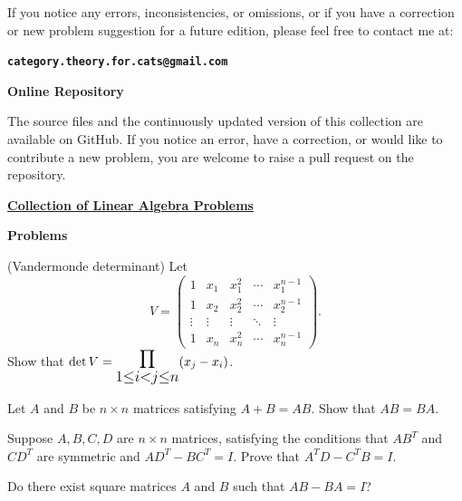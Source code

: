\documentclass[12pt]{article}
\let\oldprod\prod
\renewcommand{\prod}{\mathlarger{\mathlarger{\oldprod}}}
\begin{document}
If you notice any errors, inconsistencies, or omissions, or if you have a
correction or new problem suggestion for a future edition, please feel free to contact me at:

\noindent
\textbf{\texttt{category.theory.for.cats@gmail.com}}

\medskip

\noindent
\textbf{Online Repository}

\medskip

The source files and the continuously updated version of this collection are available on GitHub. If you notice an error, have a correction, or would like to contribute a new problem, you are welcome to raise a pull request on the repository.

\medskip
\noindent
\href{https://github.com/ZetaZero-0/Collection-of-Problems}
{\textbf{Collection of Linear Algebra Problems}}

\vfill

\newpage

\begin{center}
	{\LARGE\bfseries Problems}
\end{center}

\begin{problem}
(Vandermonde determinant) Let
\[
V=\begin{pmatrix}
1 & x_1 & x_1^2 & \cdots & x_1^{n-1}\\
1 & x_2 & x_2^2 & \cdots & x_2^{n-1}\\
\vdots & \vdots & \vdots & \ddots & \vdots\\
1 & x_n & x_n^2 & \cdots & x_n^{n-1}
\end{pmatrix}.
\]
Show that $\det V = \displaystyle\prod_{1\le i<j\le n}(x_j-x_i)$.
\end{problem}

\begin{problem}
Let $A$ and $B$ be $n\times n$ matrices satisfying $A+B=AB$. Show that $AB=BA$.
\end{problem}

\begin{problem}
Suppose $A,B,C,D$ are $n\times n$ matrices, satisfying the conditions that $AB^T$ and $CD^T$ are symmetric and $AD^T-BC^T=I$. Prove that $A^TD-C^TB=I$.
\end{problem}

\begin{problem}
Do there exist square matrices $A$ and $B$ such that $AB-BA=I$?
\end{problem}
\end{document}
